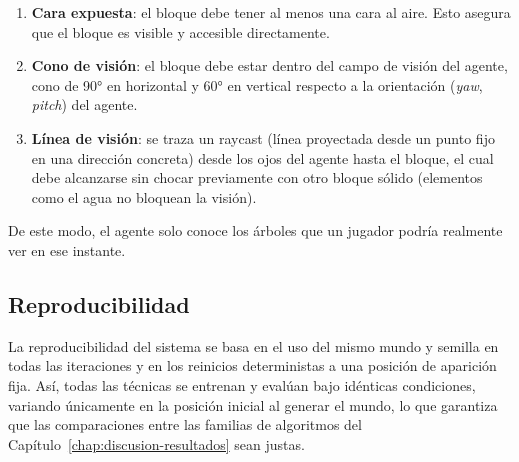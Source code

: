 \begin{enumerate}
  \item \textbf{Cara expuesta}: el bloque debe tener al menos una cara al aire. Esto
        asegura que el bloque es visible y accesible directamente.
  \item \textbf{Cono de visión}: el bloque debe estar dentro del campo de visión
        del agente, cono de \ang{90} en horizontal y
        \ang{60} en vertical respecto a la orientación (\textit{yaw}, \textit{pitch})
        del agente.
  \item \textbf{Línea de visión}: se traza un \gls{raycast} (línea proyectada desde un punto fijo en una dirección concreta)
        desde los ojos del agente hasta el bloque, el cual debe alcanzarse sin chocar previamente con otro bloque sólido
        (elementos como el agua no bloquean la visión).
\end{enumerate}

De este modo, el agente solo conoce los árboles que un jugador podría realmente
ver en ese instante.

\subsection{Reproducibilidad}
La reproducibilidad del sistema se basa en el uso del mismo mundo y \gls{semilla} en todas las iteraciones y en los
reinicios deterministas a una posición de aparición fija. Así, todas las técnicas se entrenan y evalúan bajo
idénticas condiciones, variando únicamente en la posición inicial al generar el mundo, lo que garantiza que las comparaciones 
entre las familias de algoritmos del Capítulo~\ref{chap:discusion-resultados} sean justas.